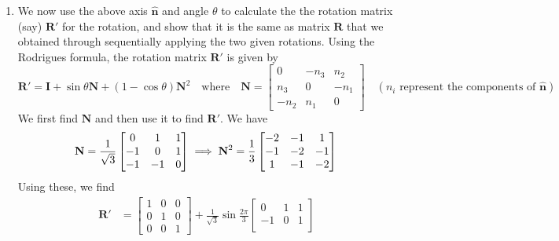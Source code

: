 \documentclass[10pt]{article}
\newcommand{\unit}[1]{\mathbf{\hat{#1}}}
\begin{document}
\begin{enumerate}
        \item We now use the above axis $\unit{n}$ and angle $\theta$ to calculate the
        the rotation matrix (say) $\mathbf{R'}$ for the rotation, and show that it is the
        same as matrix $\mathbf{R}$ that we obtained through sequentially applying the two
        given rotations. Using the Rodrigues formula, the rotation matrix $\mathbf{R'}$ is
        given by
        \begin{equation*}
            \mathbf{R'} = \mathbf{I} + \sin{\theta} \mathbf{N} + (1 - \cos{\theta}) \mathbf{N}^2
            \quad \text{where} \quad \mathbf{N} = \begin{bmatrix}
                0 & -n_{3} & n_{2} \\
                n_{3} & 0 & -n_{1} \\
                -n_{2} & n_{1} & 0
            \end{bmatrix} \quad (n_{i} \text{ represent the components of } \unit{n})
        \end{equation*}
        We first find $\mathbf{N}$ and then use it to find $\mathbf{R'}$. We have
        \begin{equation*}
            \mathbf{N} =  \frac{1}{\sqrt{3}} \begin{bmatrix}
                0 & 1 & 1 \\
                -1 & 0 & 1 \\
                -1 & -1 & 0
            \end{bmatrix} \implies \mathbf{N}^{2} = \frac{1}{3} \begin{bmatrix}
                -2 & -1 & 1 \\
                -1 & -2 & -1 \\
                1 & -1 & -2
            \end{bmatrix} \\
        \end{equation*}
        Using these, we find
        \begin{align*}
            \mathbf{R'} &= \begin{bmatrix}
                1 & 0 & 0 \\
                0 & 1 & 0 \\
                0 & 0 & 1
            \end{bmatrix} + \frac{1}{\sqrt{3}} \sin{\frac{2\pi}{3}} \begin{bmatrix}
                0 & 1 & 1 \\
                -1 & 0 & 1 \\

\end{bmatrix}
\end{align*}
\end{enumerate}
\end{document}
